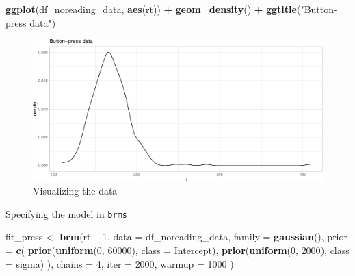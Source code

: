 \documentclass[12pt,ignorenonframetext,aspectratio=169]{beamer}
\newenvironment{Shaded}{\begin{snugshade}}{\end{snugshade}}
\newcommand{\DataTypeTok}[1]{\textcolor[rgb]{0.13,0.29,0.53}{#1}}
\newcommand{\DecValTok}[1]{\textcolor[rgb]{0.00,0.00,0.81}{#1}}
\newcommand{\KeywordTok}[1]{\textcolor[rgb]{0.13,0.29,0.53}{\textbf{#1}}}
\newcommand{\NormalTok}[1]{#1}
\newcommand{\OperatorTok}[1]{\textcolor[rgb]{0.81,0.36,0.00}{\textbf{#1}}}
\newcommand{\StringTok}[1]{\textcolor[rgb]{0.31,0.60,0.02}{#1}}
\begin{document}
\begin{frame}[fragile]

\small

\begin{Shaded}
\begin{Highlighting}[]
\KeywordTok{ggplot}\NormalTok{(df_noreading_data, }\KeywordTok{aes}\NormalTok{(rt)) }\OperatorTok{+}
\StringTok{  }\KeywordTok{geom_density}\NormalTok{() }\OperatorTok{+}
\StringTok{  }\KeywordTok{ggtitle}\NormalTok{(}\StringTok{"Button-press data"}\NormalTok{)}
\end{Highlighting}
\end{Shaded}

\begin{figure}
\centering
\includegraphics{03-compbayes-slides_files/figure-beamer/m1visualize-1.pdf}
\caption{\label{fig:m1visualize}Visualizing the data}
\end{figure}

\normalsize

\end{frame}

\begin{frame}[fragile]{Specifying the model in \texttt{brms}}
\protect\hypertarget{specifying-the-model-in-brms}{}

\small

\begin{Shaded}
\begin{Highlighting}[]
\NormalTok{fit_press <-}\StringTok{ }\KeywordTok{brm}\NormalTok{(rt }\OperatorTok{~}\StringTok{ }\DecValTok{1}\NormalTok{,}
  \DataTypeTok{data =}\NormalTok{ df_noreading_data,}
  \DataTypeTok{family =} \KeywordTok{gaussian}\NormalTok{(),}
  \DataTypeTok{prior =} \KeywordTok{c}\NormalTok{(}
    \KeywordTok{prior}\NormalTok{(}\KeywordTok{uniform}\NormalTok{(}\DecValTok{0}\NormalTok{, }\DecValTok{60000}\NormalTok{), }\DataTypeTok{class =}\NormalTok{ Intercept),}
    \KeywordTok{prior}\NormalTok{(}\KeywordTok{uniform}\NormalTok{(}\DecValTok{0}\NormalTok{, }\DecValTok{2000}\NormalTok{), }\DataTypeTok{class =}\NormalTok{ sigma)}
\NormalTok{  ),}
  \DataTypeTok{chains =} \DecValTok{4}\NormalTok{,}
  \DataTypeTok{iter =} \DecValTok{2000}\NormalTok{,}
  \DataTypeTok{warmup =} \DecValTok{1000}
\NormalTok{)}
\end{Highlighting}
\end{Shaded}

\normalsize

\end{frame}
\end{document}
